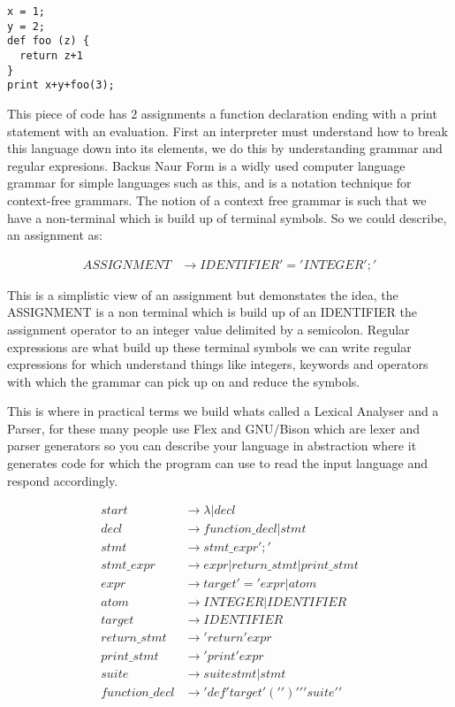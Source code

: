 \documentclass[defaultstyle,11pt]{article}
\begin{document}
\begin{lstlisting}
x = 1;
y = 2;
def foo (z) {
  return z+1
}
print x+y+foo(3);
\end{lstlisting}

This piece of code has 2 assignments a function declaration ending with a print statement with an evaluation. First an interpreter
must understand how to break this language down into its elements, we do this by understanding grammar and regular expresions. Backus Naur Form
is a widly used computer language grammar for simple languages such as this, and is a notation technique for context-free grammars. The notion of
a context free grammar is such that we have a non-terminal which is build up of terminal symbols. So we could describe, an assignment as:

\begin{align*}
ASSIGNMENT &\to IDENTIFIER '=' INTEGER ';'
\end{align*}

This is a simplistic view of an assignment but demonstates the idea, the ASSIGNMENT is a non terminal which is build up of an IDENTIFIER the
assignment operator to an integer value delimited by a semicolon. Regular expressions are what build up these terminal symbols we can write
regular expressions for which understand things like integers, keywords and operators with which the grammar can pick up on and reduce the symbols.

This is where in practical terms we build whats called a Lexical Analyser and a Parser, for these many people use Flex and GNU/Bison which are
lexer and parser generators so you can describe your language in abstraction where it generates code for which the program can use to read the
input language and respond accordingly.

\begin{align*}
start &\to \lambda | decl \\
decl &\to function\_decl | stmt \\
stmt &\to stmt\_expr ';' \\
stmt\_expr &\to expr | return\_stmt | print\_stmt \\
expr &\to target '=' expr | atom \\
atom &\to INTEGER | IDENTIFIER \\
target &\to IDENTIFIER \\
return\_stmt &\to 'return' expr \\
print\_stmt &\to 'print' expr \\
suite &\to suite stmt | stmt \\
function\_decl &\to 'def' target '(' ')' '{' suite '}'
\end{align*}
\end{document}
